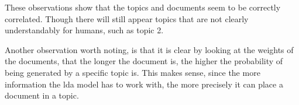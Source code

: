 These observations show that the topics and documents seem to be correctly correlated.
Though there will still appear topics that are not clearly understandably for humans, such as topic 2.

Another observation worth noting, is that it is clear by looking at the weights of the documents, that the longer the document is, the higher the probability of being generated by a specific topic is.
This makes sense, since the more information the \gls{lda} model has to work with, the more precisely it can place a document in a topic.


